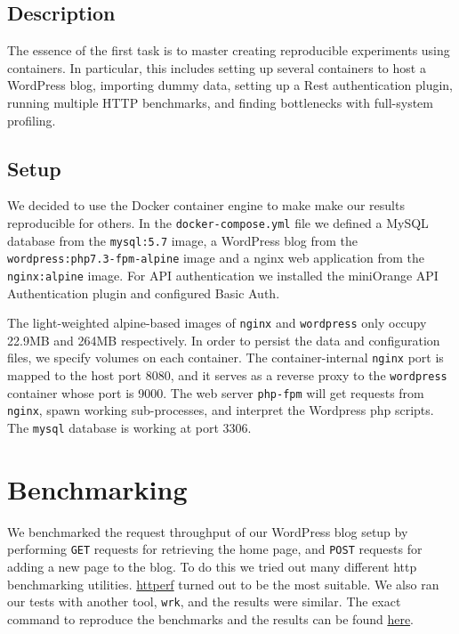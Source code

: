 \subsection{Description}

The essence of the first task is to master creating reproducible experiments using containers. In particular, this includes setting up several containers to host a WordPress blog, importing dummy data, setting up a Rest authentication plugin, running multiple HTTP benchmarks, and finding bottlenecks with full-system profiling. 

\subsection{Setup}

We decided to use the Docker container engine to make make our results reproducible for others. In the \texttt{docker-compose.yml} file we defined a MySQL database from the \texttt{mysql:5.7} image, a WordPress blog from the \texttt{wordpress:php7.3-fpm-alpine} image and a nginx web application from the \texttt{nginx:alpine} image.
For API authentication we installed the miniOrange API Authentication plugin and configured Basic Auth.

The light-weighted alpine-based images of \texttt{nginx} and \texttt{wordpress} only occupy 22.9MB and 264MB respectively. In order to persist the data and configuration files, we specify volumes on each container. The container-internal \texttt{nginx} port is mapped to the host port 8080, and it serves as a reverse proxy to the \texttt{wordpress} container whose port is 9000. The web server \texttt{php-fpm} will get requests from \texttt{nginx}, spawn working sub-processes, and interpret the Wordpress php scripts. The \texttt{mysql} database is working at port 3306.



\section{Benchmarking}

We benchmarked the request throughput of our WordPress blog setup by performing \texttt{GET} requests for retrieving the home page, and \texttt{POST} requests for adding a new page to the blog. To do this we tried out many different http benchmarking utilities. \href{https://github.com/httperf/httperf}{httperf} turned out to be the most suitable. We also ran our tests with another tool, \texttt{wrk}, and the results were similar.
The exact command to reproduce the benchmarks and the results can be found \href{https://github.com/danbachar/swiss-knife/blob/master/task1/benchmark/README.md}{here}.


